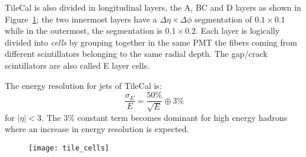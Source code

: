 TileCal is also divided in longitudinal layers, the A, BC and D layers as shown
in Figure~\ref{fig:tile_cells}; the two innermost layers have a
$\Delta \eta \times \Delta \phi$ segmentation of $0.1 \times 0.1$ while in the
outermost, the segmentation is $0.1 \times 0.2$. Each layer is logically divided
into \emph{cells} by grouping together in the same PMT the fibers coming from
different scintillators belonging to the same radial depth. The gap/crack
scintillators are also called E layer cells.

The energy resolution for jets of TileCal is:
\begin{equation}
  \label{eq:65}
  \frac{\sigma_E}{E} = \frac{50\%}{\sqrt{E}} \oplus 3\%
\end{equation}
for $|\eta| < 3$. The 3\% constant term becomes dominant for high energy hadrons
where an increase in energy resolution is expected.

\begin{figure}[!h]
  \centering
    \texttt{[image: tile\_cells]}
    \caption{}
    \label{fig:tile_cells}
\end{figure}
